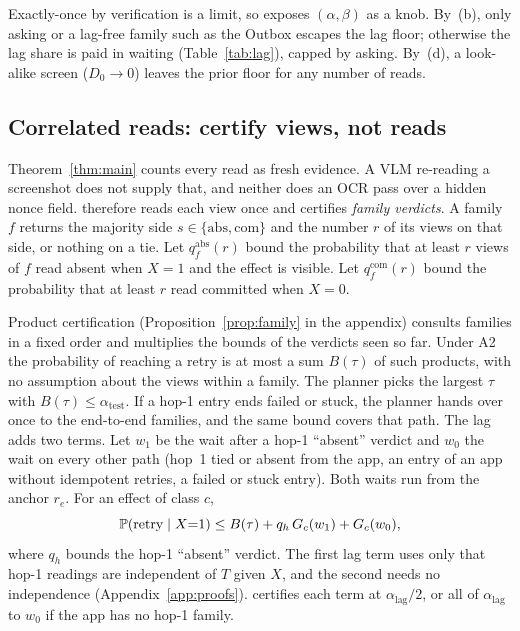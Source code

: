 Exactly-once by verification is a limit, so \sys exposes $(\alpha,\beta)$ as a knob. By~(b), only asking or a lag-free family such as the Outbox escapes the lag floor; otherwise the lag share is paid in waiting (Table~\ref{tab:lag}), capped by asking. By~(d), a look-alike screen ($D_0\to0$) leaves the prior floor for any number of reads.

\subsection{Correlated reads: certify views, not reads}
\label{sec:theory-corr}
Theorem~\ref{thm:main} counts every read as fresh evidence. A VLM re-reading a screenshot does not supply that, and neither does an OCR pass over a hidden nonce field.
\alg therefore reads each view once and certifies \emph{family verdicts}. A family $f$ returns the majority side $s\in\{\mathrm{abs},\mathrm{com}\}$ and the number $r$ of its views
on that side, or nothing on a tie. Let $q^{\mathrm{abs}}_f(r)$ bound the probability that at least $r$ views of $f$ read absent when $X{=}1$ and the effect is visible. Let
$q^{\mathrm{com}}_f(r)$ bound the probability that at least $r$ read committed when $X{=}0$.

Product certification (Proposition~\ref{prop:family} in the appendix) consults families in a fixed order and multiplies the bounds of the verdicts seen so far. Under A2 the
probability of reaching a retry is at most a sum $B(\tau)$ of such products, with no assumption about the views within a family. The planner picks the largest $\tau$ with
$B(\tau)\le\alpha_{\mathrm{test}}$. If a hop-1 entry ends failed or stuck, the planner hands over once to the end-to-end families, and the same bound covers that path.
The lag adds two terms. Let $w_1$ be the wait after a hop-1 ``absent'' verdict and $w_0$ the wait on every other path (hop~1 tied or absent from the app, an entry of an app without idempotent retries,
a failed or stuck entry). Both waits run from the anchor $r_e$. For an effect of class $c$,
\begin{equation}
\mathbb{P}(\text{retry}\mid X{=}1)\le B(\tau)+q_h\,G_c(w_1)+G_c(w_0),
\label{eq:lagsplit}
\end{equation}
where $q_h$ bounds the hop-1 ``absent'' verdict. The first lag term uses only that hop-1 readings are independent of $T$ given $X$, and the second needs no independence
(Appendix~\ref{app:proofs}). \alg certifies each term at $\alpha_{\mathrm{lag}}/2$, or all of
$\alpha_{\mathrm{lag}}$ to $w_0$ if the app has no hop-1 family.

